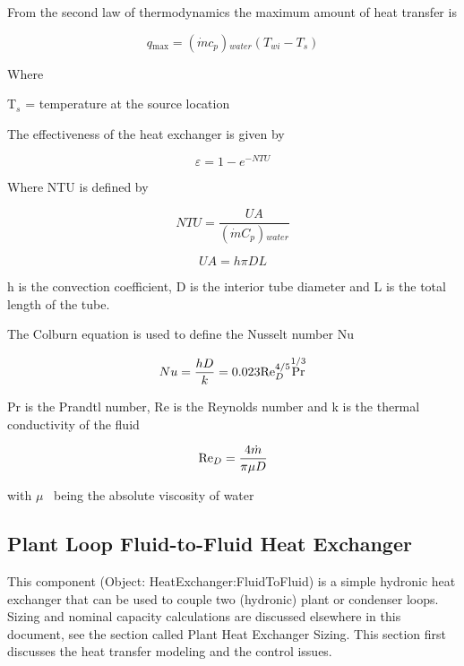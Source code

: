 From the second law of thermodynamics the maximum amount of heat transfer is

\begin{equation}
q{}_{\max } = (\dot mc{}_p){}_{water}(T{}_{wi} - T{}_s)
\end{equation}

Where

T\(_{s}\) = temperature at the source location

The effectiveness of the heat exchanger is given by

\begin{equation}
\varepsilon  = 1 - {e^{ - NTU}}
\end{equation}

Where NTU is defined by

\begin{equation}
NTU = \frac{{UA}}{{(\dot mC{}_p){}_{water}}}
\end{equation}

\begin{equation}
UA = h\pi DL
\end{equation}

h is the convection coefficient, D is the interior tube diameter and L is the total length of the tube.

The Colburn equation is used to define the Nusselt number Nu

\begin{equation}
Nu = \frac{{hD}}{k} = 0.023{\mathop{\rm Re}\nolimits} {{}_D^{4/5}}{\Pr ^{1/3}}
\end{equation}

Pr is the Prandtl number, Re is the Reynolds number and k is the thermal conductivity of the fluid

\begin{equation}
{\mathop{\rm Re}\nolimits} {}_D = \frac{{4\dot m}}{{\pi \mu D}}
\end{equation}

with \(\mu\) ~being the absolute viscosity of water

\subsection{Plant Loop Fluid-to-Fluid Heat Exchanger}\label{plant-loop-fluid-to-fluid-heat-exchanger}

This component (Object: HeatExchanger:FluidToFluid) is a simple hydronic heat exchanger that can be used to couple two (hydronic) plant or condenser loops.~ Sizing and nominal capacity calculations are discussed elsewhere in this document, see the section called Plant Heat Exchanger Sizing. This section first discusses the heat transfer modeling and the control issues.

